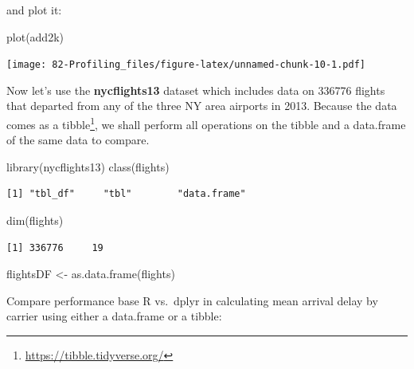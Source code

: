 \documentclass[
]{book}
\newenvironment{Shaded}{\begin{snugshade}}{\end{snugshade}}
\newcommand{\FunctionTok}[1]{\textcolor[rgb]{0.00,0.00,0.00}{#1}}
\newcommand{\NormalTok}[1]{#1}
\newcommand{\OtherTok}[1]{\textcolor[rgb]{0.56,0.35,0.01}{#1}}
\renewcommand{\href}[2]{#2\footnote{\url{#1}}}
\begin{document}
and plot it:

\begin{Shaded}
\begin{Highlighting}[]
\FunctionTok{plot}\NormalTok{(add2k)}
\end{Highlighting}
\end{Shaded}

\texttt{[image: 82-Profiling\_files/figure-latex/unnamed-chunk-10-1.pdf]}

Now let's use the \textbf{nycflights13} dataset which includes data on 336776 flights that departed from any of the three NY area airports in 2013. Because the data comes as a \href{https://tibble.tidyverse.org/}{tibble}, we shall perform all operations on the tibble and a data.frame of the same data to compare.

\begin{Shaded}
\begin{Highlighting}[]
\FunctionTok{library}\NormalTok{(nycflights13)}
\FunctionTok{class}\NormalTok{(flights)}
\end{Highlighting}
\end{Shaded}

\begin{verbatim}
[1] "tbl_df"     "tbl"        "data.frame"
\end{verbatim}

\begin{Shaded}
\begin{Highlighting}[]
\FunctionTok{dim}\NormalTok{(flights)}
\end{Highlighting}
\end{Shaded}

\begin{verbatim}
[1] 336776     19
\end{verbatim}

\begin{Shaded}
\begin{Highlighting}[]
\NormalTok{flightsDF }\OtherTok{\textless{}{-}} \FunctionTok{as.data.frame}\NormalTok{(flights)}
\end{Highlighting}
\end{Shaded}

Compare performance base R vs.~dplyr in calculating mean arrival delay by carrier using either a data.frame or a tibble:
\end{document}
